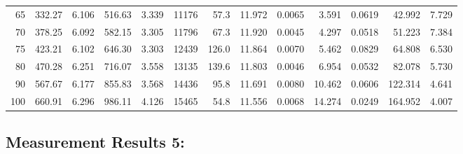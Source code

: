 \documentclass[10pt]{article}
\begin{document}
{\begin{tabular}{|r|rr|rr|rr|rr|rr|r|r|}
       65 &       332.27 &        6.106 &       516.63 &        3.339 &        11176 &         57.3 &       11.972 &       0.0065 &        3.591 &       0.0619 &       42.992 &        7.729 \\
       70 &       378.25 &        6.092 &       582.15 &        3.305 &        11796 &         67.3 &       11.920 &       0.0045 &        4.297 &       0.0518 &       51.223 &        7.384 \\
       75 &       423.21 &        6.102 &       646.30 &        3.303 &        12439 &        126.0 &       11.864 &       0.0070 &        5.462 &       0.0829 &       64.808 &        6.530 \\
       80 &       470.28 &        6.251 &       716.07 &        3.558 &        13135 &        139.6 &       11.803 &       0.0046 &        6.954 &       0.0532 &       82.078 &        5.730 \\
       90 &       567.67 &        6.177 &       855.83 &        3.568 &        14436 &         95.8 &       11.691 &       0.0080 &       10.462 &       0.0606 &      122.314 &        4.641 \\
      100 &       660.91 &        6.296 &       986.11 &        4.126 &        15465 &         54.8 &       11.556 &       0.0068 &       14.274 &       0.0249 &      164.952 &        4.007 \\
\hline
\end{tabular}
}



\subsection*{\large \bf Measurement Results 5:}
\end{document}
